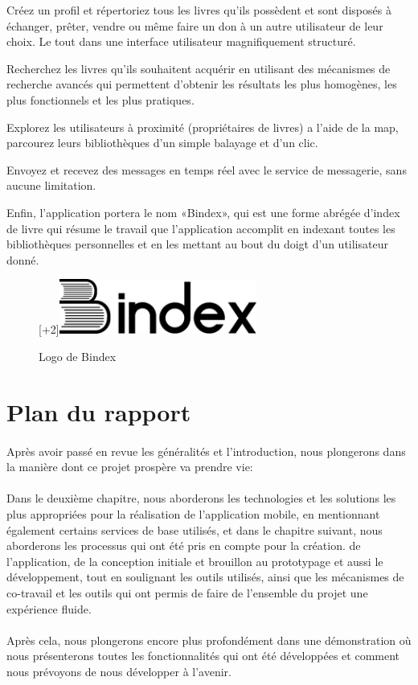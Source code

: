 \begin{list}{•}{}
	\item Créez un profil et répertoriez tous les livres qu’ils possèdent et sont disposés à échanger, prêter, vendre ou même faire un don à un autre utilisateur de leur choix. Le tout dans une interface utilisateur magnifiquement structuré.
	\item Recherchez les livres qu'ils souhaitent acquérir en utilisant des mécanismes de recherche avancés qui permettent d'obtenir les résultats les plus homogènes, les plus fonctionnels et les plus pratiques.
	\item Explorez les utilisateurs à proximité (propriétaires de livres) a l'aide de la map, parcourez leurs bibliothèques d'un simple balayage et d'un clic.
	\item Envoyez et recevez des messages en temps réel avec le service de messagerie, sans aucune limitation.
\end{list}

Enfin, l’application portera le nom «Bindex», qui est une forme abrégée d’index de livre qui résume le travail que l’application accomplit en indexant toutes les bibliothèques personnelles et en les mettant au bout du doigt d’un utilisateur donné.

\begin{figure}[h]
	\begin{center}
		\raisebox{0pt}[\dimexpr\height+2\baselineskip\relax]{\includegraphics[width=6.5cm]{Images/chapter1/bindexLogo.png}}
		\caption{{\footnotesize Logo de Bindex}}
	\end{center}
\end{figure}

\section{Plan du rapport}
\paragraph*{}
Après avoir passé en revue les généralités et l’introduction, nous plongerons dans la manière dont ce projet prospère va prendre vie:
\paragraph*{}
Dans le deuxième chapitre, nous aborderons les technologies et les solutions les plus appropriées pour la réalisation de l’application mobile, en mentionnant également certains services de base utilisés, et dans le chapitre suivant, nous aborderons les processus qui ont été pris en compte pour la création. de l’application, de la conception initiale et brouillon au prototypage et aussi le développement, tout en soulignant les outils utilisés, ainsi que les mécanismes de co-travail et les outils qui ont permis de faire de l’ensemble du projet une expérience fluide.
\paragraph*{}
Après cela, nous plongerons encore plus profondément dans une démonstration où nous présenterons toutes les fonctionnalités qui ont été développées et comment nous prévoyons de nous développer à l’avenir.

